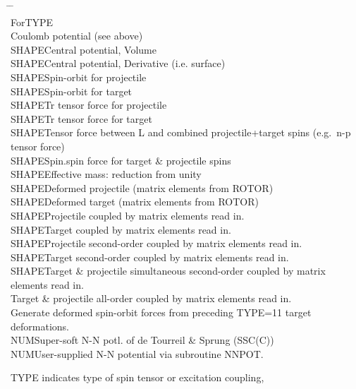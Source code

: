 \documentclass[11pt]{article}
\begin{document}
\begin{tabbing}
\hspace*{5mm} \= \hspace*{1cm} \= \hspace*{2cm} \= \\
For\>TYPE\\
\> \>Coulomb potential (see above)\\
\>SHAPE\>Central potential, Volume\\
\>SHAPE\>Central potential, Derivative (i.e. surface)\\
\>SHAPE\>Spin-orbit for projectile\\
\>SHAPE\>Spin-orbit for target\\
\>SHAPE\>Tr tensor force for projectile\\
\>SHAPE\>Tr tensor force for target\\
\>SHAPE\>Tensor force between L and combined projectile+target spins
(e.g.~n-p tensor force)\\
\>SHAPE\>Spin.spin force for target \& projectile spins\\
\>SHAPE\>Effective mass: reduction from unity\\
\>SHAPE\>Deformed projectile   (matrix elements from ROTOR)\\
\>SHAPE\>Deformed target       (matrix elements from ROTOR)\\
\>SHAPE\>Projectile coupled by matrix elements read in.\\
\>SHAPE\>Target     coupled by matrix elements read in.\\
\>SHAPE\>Projectile second-order coupled by matrix elements read in.\\
\>SHAPE\>Target second-order coupled by matrix elements read in.\\
\>SHAPE\>Target \& projectile simultaneous second-order coupled by matrix elements read in.\\
\>     \>Target \& projectile all-order coupled by matrix elements read in.\\
\>     \>Generate deformed spin-orbit forces from preceding TYPE=11 target deformations.\\
\>NUM\>Super-soft N-N potl. of de Tourreil \& Sprung (SSC(C))\\
\>NUM\>User-supplied N-N potential via subroutine NNPOT.
\end{tabbing}
%

\noindent
TYPE indicates type of spin tensor or excitation coupling,
\end{document}
